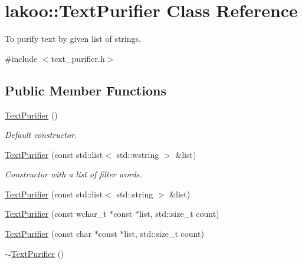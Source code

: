 \hypertarget{classlakoo_1_1_text_purifier}{}\section{lakoo\+:\+:Text\+Purifier Class Reference}
\label{classlakoo_1_1_text_purifier}


To purify text by given list of strings.  




{\ttfamily \#include $<$text\+\_\+purifier.\+h$>$}

\subsection*{Public Member Functions}
\begin{DoxyCompactItemize}
\item 
\mbox{\label{classlakoo_1_1_text_purifier_af8f553f1dca1ad70110dd14e872a783d}} 
\hyperlink{classlakoo_1_1_text_purifier_af8f553f1dca1ad70110dd14e872a783d}{Text\+Purifier} ()
\begin{DoxyCompactList}\small\item\em Default constructor. \end{DoxyCompactList}\item 
\hyperlink{classlakoo_1_1_text_purifier_aabaa9cc28934e9ef8a930d6e821efdf3}{Text\+Purifier} (const std\+::list$<$ std\+::wstring $>$ \&list)
\begin{DoxyCompactList}\small\item\em Constructor with a list of filter words. \end{DoxyCompactList}\item 
\hyperlink{classlakoo_1_1_text_purifier_aa0788313b1f9bcc6a96a0ccf09d8c839}{Text\+Purifier} (const std\+::list$<$ std\+::string $>$ \&list)
\item 
\hyperlink{classlakoo_1_1_text_purifier_a99488dd2cead65fb7d4f8de98ec41a27}{Text\+Purifier} (const wchar\+\_\+t $\ast$const $\ast$list, std\+::size\+\_\+t count)
\item 
\hyperlink{classlakoo_1_1_text_purifier_ab2e926137c1d58fe13803f6b871c9e55}{Text\+Purifier} (const char $\ast$const $\ast$list, std\+::size\+\_\+t count)
\item 
\mbox{\label{classlakoo_1_1_text_purifier_a9e6b1c76afb6c25ded0a27f3cea5802d}} 
\hyperlink{classlakoo_1_1_text_purifier_a9e6b1c76afb6c25ded0a27f3cea5802d}{$\sim$\+Text\+Purifier} ()

\end{DoxyCompactItemize}
